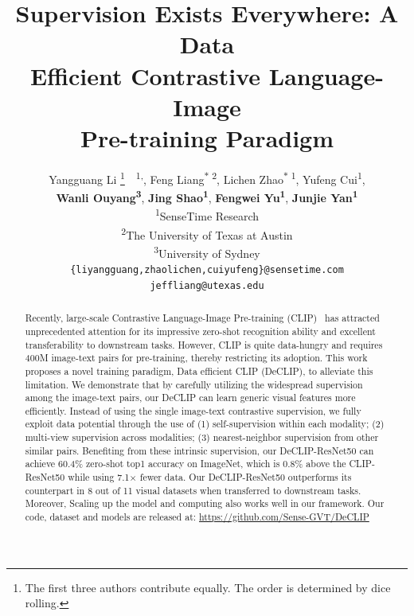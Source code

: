\documentclass{article} %
\title{Supervision Exists Everywhere: A Data \\
Efficient Contrastive Language-Image \\
Pre-training Paradigm}
\author{Yangguang Li \thanks{The first three authors contribute equally. The order is determined by dice rolling.}~~\textsuperscript{\rm 1,}, 
        Feng Liang\textsuperscript{\rm$\ast$ 2}, 
        Lichen Zhao\textsuperscript{\rm$\ast$ 1},
        Yufeng Cui\textsuperscript{\rm 1}, \\
        \textbf{Wanli Ouyang\textsuperscript{\rm 3}}, 
        \textbf{Jing Shao\textsuperscript{\rm 1}}, 
        \textbf{Fengwei Yu\textsuperscript{\rm 1}}, 
        \textbf{Junjie Yan\textsuperscript{\rm 1}}\\

\textsuperscript{\rm 1}SenseTime Research \\
\textsuperscript{\rm 2}The University of Texas at Austin \\
\textsuperscript{\rm 3}University of Sydney\\

\texttt{\{liyangguang,zhaolichen,cuiyufeng\}@sensetime.com}\\
\texttt{jeffliang@utexas.edu}\\



}
\newcommand{\workname}{DeCLIP\xspace}
\newcommand{\lf}[1]{{{\color{blue}#1}}{}}
\begin{document}

\maketitle
\begin{abstract}
Recently, large-scale Contrastive Language-Image Pre-training (CLIP)~\citep{radford2021learning} has attracted unprecedented attention for its impressive zero-shot recognition ability and excellent transferability to downstream tasks. 
However, CLIP is quite data-hungry and requires 400M image-text pairs for pre-training, thereby restricting its adoption. 
This work proposes a novel training paradigm, Data efficient CLIP (\workname), to alleviate this limitation.
We demonstrate that by carefully utilizing the widespread supervision among the image-text pairs, our \workname can learn generic visual features more efficiently.
Instead of using the single image-text contrastive supervision, we fully exploit data potential through the use of (1) self-supervision within each modality; (2) multi-view supervision across modalities; (3) nearest-neighbor supervision from other similar pairs.
Benefiting from these intrinsic supervision, our \workname-ResNet50 can achieve 60.4\% zero-shot top1 accuracy on ImageNet, which is 0.8\% above the CLIP-ResNet50 while using 7.1$\times$ fewer data. 
Our \workname-ResNet50 outperforms its counterpart in 8 out of 11 visual datasets when transferred to downstream tasks.
Moreover, Scaling up the model and computing also works well in our framework. 
Our code, dataset and models are released at: \url{https://github.com/Sense-GVT/DeCLIP}

\end{abstract}

% 


\end{document}
